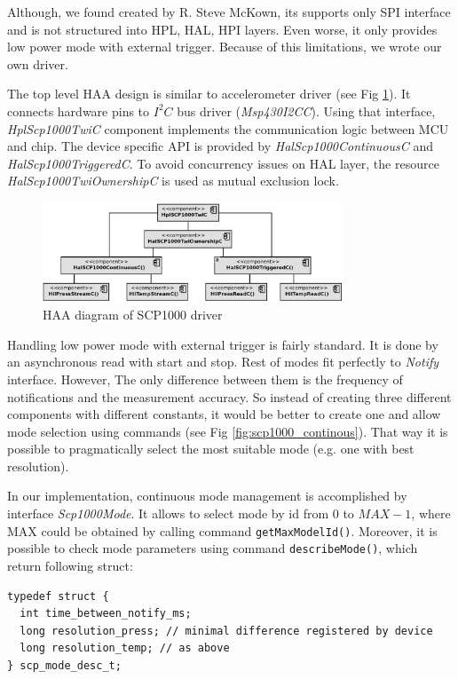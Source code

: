 Although, we found \cite{SCP1000SpiDriver} created by R. Steve McKown, its supports only SPI interface and is not structured into HPL, HAL, HPI layers.
Even worse, it only provides low power mode with external trigger.
Because of this limitations, we wrote our own driver.

The top level HAA design is similar to accelerometer driver (see Fig \ref{fig:scp1000_haa}).
It connects hardware pins to $I^2C$ bus driver (\emph{Msp430I2CC}).
Using that interface, \emph{HplScp1000TwiC} component implements the communication logic between MCU and chip.
The device specific API is provided by \emph{HalScp1000ContinuousC} and \emph{HalScp1000TriggeredC}.
To avoid concurrency issues on HAL layer, the resource \emph{HalScp1000TwiOwnershipC} is used as mutual exclusion lock.

\begin{figure}[h]
  \centering
  \includegraphics[width=0.8\textwidth]{diagrams/scp1000_haa.eps}
  \caption{HAA diagram of SCP1000 driver}
  \label{fig:scp1000_haa}
\end{figure}

Handling low power mode with external trigger is fairly standard.
It is done by an asynchronous read with start and stop. 
Rest of modes fit perfectly to \emph{Notify} interface.
However, The only difference between them is the frequency of notifications and the measurement accuracy.
So instead of creating three different components with different constants, it would be better to create one and allow mode selection using commands (see Fig \ref{fig:scp1000_continous}).
That way it is possible to pragmatically select the most suitable mode (e.g. one with best resolution).

In our implementation, continuous mode management is accomplished by interface \emph{Scp1000Mode}.
It allows to select mode by id from $0$ to $MAX - 1$, where MAX could be obtained by calling command \verb|getMaxModelId()|.
Moreover, it is possible to check mode parameters using command \verb|describeMode()|, which return following struct:
\begin{verbatim}
typedef struct {
  int time_between_notify_ms;
  long resolution_press; // minimal difference registered by device
  long resolution_temp; // as above
} scp_mode_desc_t;
\end{verbatim}


